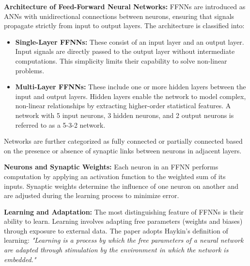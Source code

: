 \textbf{Architecture of Feed-Forward Neural Networks:} FFNNs are introduced as ANNs with unidirectional connections between neurons, ensuring that signals propagate strictly from input to output layers. The architecture is classified into:
\begin{itemize}
    \item \textbf{Single-Layer FFNNs:} These consist of an input layer and an output layer. Input signals are directly passed to the output layer without intermediate computations. This simplicity limits their capability to solve non-linear problems.
    \item \textbf{Multi-Layer FFNNs:} These include one or more hidden layers between the input and output layers. Hidden layers enable the network to model complex, non-linear relationships by extracting higher-order statistical features. A network with 5 input neurons, 3 hidden neurons, and 2 output neurons is referred to as a 5-3-2 network. 
\end{itemize}
Networks are further categorized as fully connected or partially connected based on the presence or absence of synaptic links between neurons in adjacent layers.

\textbf{Neurons and Synaptic Weights:} Each neuron in an FFNN performs computation by applying an activation function to the weighted sum of its inputs. Synaptic weights determine the influence of one neuron on another and are adjusted during the learning process to minimize error.

\textbf{Learning and Adaptation:} The most distinguishing feature of FFNNs is their ability to learn. Learning involves adapting free parameters (weights and biases) through exposure to external data. The paper adopts Haykin's definition of learning: \textit{"Learning is a process by which the free parameters of a neural network are adapted through stimulation by the environment in which the network is embedded."}

